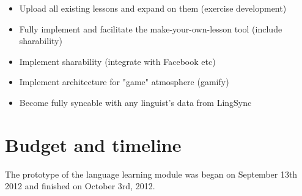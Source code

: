 \documentclass[12pt]{article} %
\begin{document}
\begin{itemize}

\item Upload all existing lessons and expand on them (exercise development)

\item Fully implement and facilitate the make-your-own-lesson tool (include sharability)

\item Implement sharability (integrate with Facebook etc)

\item Implement architecture for "game" atmosphere (gamify)

\item Become fully syncable with any linguist's data from LingSync

\end{itemize}

\section{Budget and timeline }

The prototype of the language learning module was began on September 13th 2012 and finished on October 3rd, 2012. 
\end{document}
